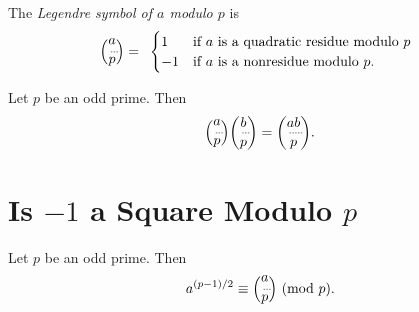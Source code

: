 \documentclass[10pt]{article}
\begin{document}
\begin{comment}
\begin{theorem}[Quadratic Residue Multiplication Rule] 
(Version 1) Let $p$ be an odd prime. Then:
    \begin{enumerate}[label=(\roman*)]
        \item The product of two quadratic residues modulo $p$ is a quadratic residue.
        \item The product of a quadratic residue and a nonresidue is a non residue.
        \item The product of two non residues is a quadratic residue.
    \end{enumerate}
These three rules can be summarized symbolically by the formulas
    \[QR \times QR = QR, \quad QR \times NR = NR, \quad NR \times NR = QR.\]
\end{theorem}
\end{comment}

\begin{definition*}[\textcolor{red}{Legendre Symbol of $a$ modulo $p$}]
    The \emph{Legendre symbol of $a$ modulo $p$} is
    \[\legendre{a}{p} = \begin{array}{cc}  
        \begin{cases}
        1 & \textnormal{if $a$ is a quadratic residue modulo $p$} \\
        -1 & \textnormal{if $a$ is a nonresidue modulo $p$.}
    \end{cases}
\end{array}\]
\end{definition*}

\begin{theorem}[\textcolor{red}{Quadratic Residue Multiplication Rule}]
    Let $p$ be an odd prime. Then
    \[\legendre{a}{p}\legendre{b}{p}=\legendre{ab}{p}.\] 
\end{theorem}

\section{Is $-1$ a Square Modulo $p$}

\begin{theorem}[\textcolor{red}{Euler's Criterion}]
    Let $p$ be an odd prime. Then
    \[a^{(p-1)/2} \equiv \legendre{a}{p} \mod{p}.\]
\end{theorem}
\end{document}
